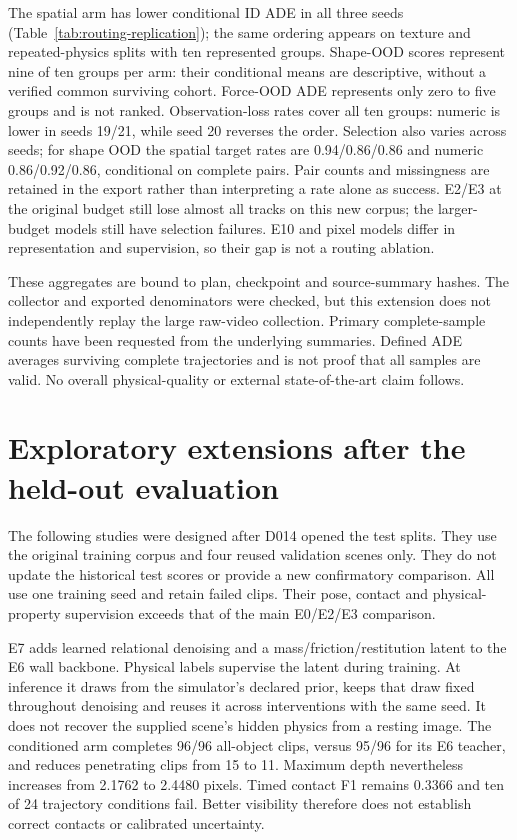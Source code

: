 \documentclass[11pt,a4paper]{article}
\begin{document}
The spatial arm has lower conditional ID ADE in all three seeds
(Table~\ref{tab:routing-replication}); the same ordering appears on texture and
repeated-physics splits with ten represented groups. Shape-OOD scores represent
nine of ten groups per arm: their conditional means are descriptive, without a
verified common surviving cohort. Force-OOD ADE represents only zero to five groups and
is not ranked. Observation-loss rates cover all ten groups: numeric is lower
in seeds 19/21, while seed 20 reverses the order. Selection also varies across
seeds; for shape OOD the spatial target rates are 0.94/0.86/0.86 and numeric
0.86/0.92/0.86, conditional on complete pairs. Pair counts and missingness are
retained in the export rather than interpreting a rate alone as success.
E2/E3 at the original budget still lose almost all tracks on this new corpus;
the larger-budget models still have selection failures. E10 and pixel models
differ in representation and supervision, so their gap is not a routing ablation.

These aggregates are bound to plan, checkpoint and source-summary hashes.
The collector and exported denominators were checked, but this extension does
not independently replay the large raw-video collection. Primary complete-sample
counts have been requested from the underlying summaries. Defined ADE averages
surviving complete trajectories and is not proof that all samples are valid.
No overall physical-quality or external state-of-the-art claim follows.

\section{Exploratory extensions after the held-out evaluation}
\label{sec:exploratory}
The following studies were designed after D014 opened the test splits. They use the original training corpus and four reused validation scenes only. They do not update the historical test scores or provide a new confirmatory comparison. All use one training seed and retain failed clips. Their pose, contact and physical-property supervision exceeds that of the main E0/E2/E3 comparison.

E7 adds learned relational denoising and a mass/friction/restitution latent to the E6 wall backbone. Physical labels supervise the latent during training. At inference it draws from the simulator's declared prior, keeps that draw fixed throughout denoising and reuses it across interventions with the same seed. It does not recover the supplied scene's hidden physics from a resting image. The conditioned arm completes 96/96 all-object clips, versus 95/96 for its E6 teacher, and reduces penetrating clips from 15 to 11. Maximum depth nevertheless increases from 2.1762 to 2.4480 pixels. Timed contact F1 remains 0.3366 and ten of 24 trajectory conditions fail. Better visibility therefore does not establish correct contacts or calibrated uncertainty.
\end{document}
